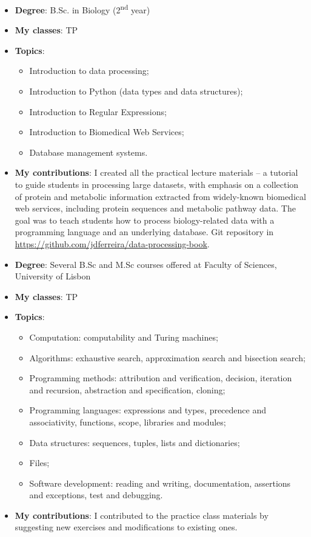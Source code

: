 \begin{itemize}
    \item \textbf{Degree}: B.Sc. in Biology (2\textsuperscript{nd} year)
    \item \textbf{My classes}: TP
    \item \textbf{Topics}:
    \begin{itemize}
        \item Introduction to data processing;
        \item Introduction to Python (data types and data structures);
        \item Introduction to Regular Expressions;
        \item Introduction to Biomedical Web Services;
        \item Database management systems.
    \end{itemize}
    \item \textbf{My contributions}: I created all the practical lecture materials -- a tutorial to guide students in processing large datasets, with emphasis on a collection of protein and metabolic information extracted from widely-known biomedical web services, including protein sequences and metabolic pathway data. The goal was to teach students how to process biology-related data with a programming language and an underlying database. Git repository in \url{https://github.com/jdferreira/data-processing-book}.
\end{itemize}


\begin{itemize}
    \item \textbf{Degree}: Several B.Sc and M.Sc courses offered at Faculty of Sciences, University of Lisbon
    \item \textbf{My classes}: TP
    \item \textbf{Topics}:
    \begin{itemize}
        \item Computation: computability and Turing machines;
        \item Algorithms: exhaustive search, approximation search and bisection search;
        \item Programming methods: attribution and verification, decision, iteration and recursion, abstraction and specification, cloning;
        \item Programming languages: expressions and types, precedence and associativity, functions, scope, libraries and modules;
        \item Data structures: sequences, tuples, lists and dictionaries;
        \item Files;
        \item Software development: reading and writing, documentation, assertions and exceptions, test and debugging.
    \end{itemize}
    \item \textbf{My contributions}: I contributed to the practice class materials by suggesting new exercises and modifications to existing ones.
\end{itemize}


